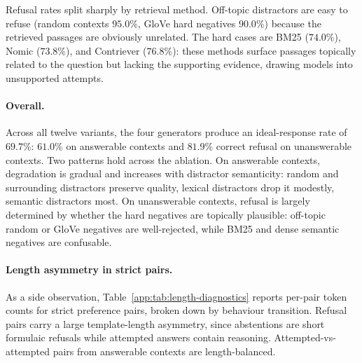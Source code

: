 \documentclass{article}
\theoremstyle{plain}
\theoremstyle{definition}
\theoremstyle{remark}
\begin{document}
Refusal rates split sharply by retrieval method. Off-topic distractors are easy to refuse (random contexts $95.0\%$, GloVe hard negatives $90.0\%$) because the retrieved passages are obviously unrelated. The hard cases are BM25 ($74.0\%$), Nomic ($73.8\%$), and Contriever ($76.8\%$): these methods surface passages topically related to the question but lacking the supporting evidence, drawing models into unsupported attempts.

\paragraph{Overall.} Across all twelve variants, the four generators produce an ideal-response rate of $69.7\%$: $61.0\%$ on answerable contexts and $81.9\%$ correct refusal on unanswerable contexts. Two patterns hold across the ablation. On answerable contexts, degradation is gradual and increases with distractor semanticity: random and surrounding distractors preserve quality, lexical distractors drop it modestly, semantic distractors most. On unanswerable contexts, refusal is largely determined by whether the hard negatives are topically plausible: off-topic random or GloVe negatives are well-rejected, while BM25 and dense semantic negatives are confusable.

\paragraph{Length asymmetry in strict pairs.} As a side observation, Table~\ref{app:tab:length-diagnostics} reports per-pair token counts for strict preference pairs, broken down by behaviour transition. Refusal pairs carry a large template-length asymmetry, since abstentions are short formulaic refusals while attempted answers contain reasoning. Attempted-vs-attempted pairs from answerable contexts are length-balanced.

\begin{center}
\begin{minipage}{\columnwidth}
\label{app:tab:length-diagnostics}
\centering
\small
\setlength{\tabcolsep}{3pt}
\end{minipage}
\end{center}
\end{document}
